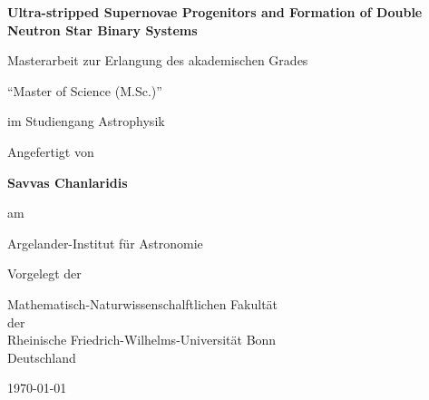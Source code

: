\documentclass[a4paper, 11pt, twoside, draft]{book}
\def\title{Ultra-stripped Supernovae Progenitors and Formation of Double Neutron Star Binary Systems}
\def\thesisauthor{Savvas Chanlaridis}
\begin{document}
    \frontmatter  %

    \begin{titlepage}
        \begin{center}
            \vspace{0.5cm}

            \huge
            \textbf{\title}

            \vspace{2.5cm}
            \Large
            Masterarbeit zur Erlangung des akademischen Grades
            
            \vspace{0.3cm}
            
           “Master of Science (M.Sc.)” \\
           
            \vspace{1.0cm}
            
          im Studiengang Astrophysik

            \vspace{1.5cm}

            {\normalsize Angefertigt von} 
             
           \vspace{0.5cm}            
            
            \textbf{\thesisauthor}
            
            \vspace{1.5cm}
            
            {\normalsize am}
            
            \vspace{0.5cm}
            
            \Large
            
            Argelander-Institut f\"ur Astronomie

            \vspace{2cm}
            
            {\normalsize Vorgelegt der }
            
            \vspace{0.5cm}


            \Large
         
            Mathematisch-Naturwissenschalftlichen Fakult\"at \\
            der \\
            Rheinische Friedrich-Wilhelms-Universit\"at Bonn\\
            Deutschland

            \vspace{1.5cm}

            \Large
            \today

        \end{center}
    \end{titlepage}
\end{document}
